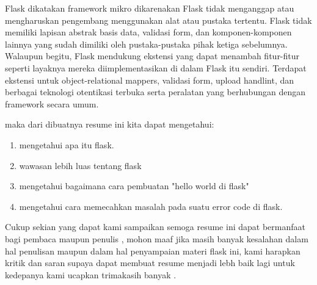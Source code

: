 \documentclass[12pt]{article}
\begin{document}
Flask dikatakan framework mikro dikarenakan Flask tidak menganggap atau mengharuskan pengembang menggunakan alat atau pustaka tertentu. Flask tidak memiliki lapisan abstrak basis data, validasi form, dan komponen-komponen lainnya yang sudah dimiliki oleh pustaka-pustaka pihak ketiga sebelumnya. Walaupun begitu, Flask mendukung ekstensi yang dapat menambah fitur-fitur seperti layaknya mereka diimplementasikan di dalam Flask itu sendiri. Terdapat ekstensi untuk object-relational mappers, validasi form, upload handlint, dan berbagai teknologi otentikasi terbuka serta peralatan yang berhubungan dengan framework secara umum\cite{solihin2016implementasi}. 

maka dari dibuatnya resume ini kita dapat mengetahui: 
	
\begin{enumerate}
\item mengetahui apa itu flask.
\item wawasan lebih luas tentang flask
\item mengetahui bagaimana cara pembuatan "hello world di flask"
\item mengetahui cara memecahkan masalah pada suatu error code di flask.
\end{enumerate}	


Cukup sekian yang dapat kami sampaikan semoga resume ini dapat bermanfaat bagi pembaca maupun penulis , mohon maaf jika masih banyak kesalahan dalam hal penulisan maupun dalam hal penyampaian materi flask ini, kami harapkan kritik dan saran supaya dapat membuat resume menjadi lebh baik lagi untuk kedepanya kami ucapkan trimakasih banyak  .
\end{document}
